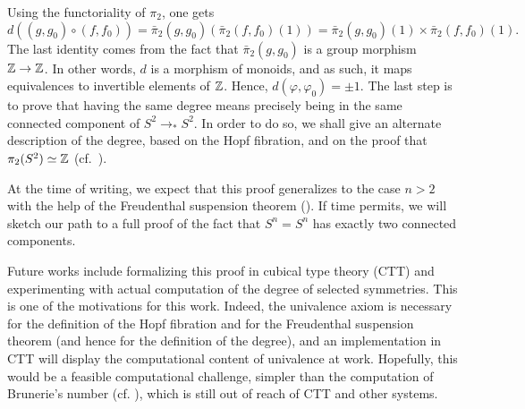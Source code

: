 \documentclass{easychair}
\newcommand{\Sp}{{S^2}}%
\newcommand{\Sn}{{S^n}}%
\newcommand{\ptdto}{\to_\ast}%
\begin{document}
Using the functoriality of $\pi_2$, one gets
\begin{displaymath}
  d((g,g_0)\circ (f,f_0)) = \bar\pi_2(g,g_0)\left( \bar\pi_2(f,f_0)(1)\right)
  = \bar\pi_2(g,g_0)(1)\times\bar\pi_2(f,f_0)(1).
\end{displaymath}
The last identity comes from the fact that $\bar\pi_2(g,g_0)$ is a
group morphism $\mathbb{Z}\to\mathbb{Z}$. In other words, $d$ is a morphism of
monoids, and as such, it maps equivalences to invertible elements of
$\mathbb{Z}$. Hence, $d(\varphi,\varphi_0) = \pm 1$. The last step is to
prove that having the same degree means precisely being in the same
connected component of $\Sp \ptdto \Sp$. In order to do so, we shall
give an alternate description of the degree, based on the Hopf
fibration, and on the proof that $\pi_2(\Sp) \weq \ZZ$ (cf.\
\cite[Ch.~8.6]{HoTT}).

At the time of writing, we expect that this proof generalizes to the
case $n>2$ with the help of the Freudenthal suspension theorem
(\cite[Ch.~8.6]{HoTT}). If time permits, we will sketch our path to a
full proof of the fact that $\Sn = \Sn$ has exactly two connected
components.

Future works include formalizing this proof in cubical type theory
(CTT) and experimenting with actual computation of the degree of
selected symmetries. This is one of the motivations for this
work. Indeed, the univalence axiom is necessary for the definition of
the Hopf fibration and for the Freudenthal suspension theorem (and
hence for the definition of the degree), and an implementation in CTT
will display the computational content of univalence at
work. Hopefully, this would be a feasible computational challenge,
simpler than the computation of Brunerie's number (cf. \cite[Corollary
3.4.5]{brunerie:thesis}), which is still out of reach of CTT and other
systems.



\end{document}

